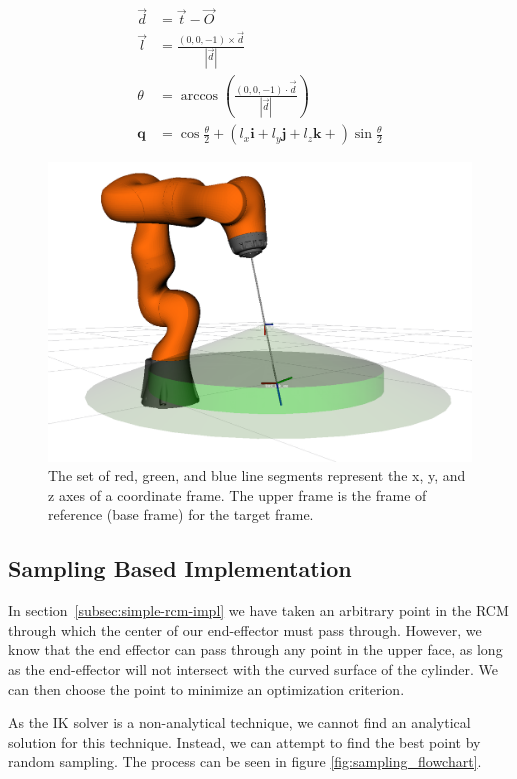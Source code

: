 \documentclass[BTech]{iitmdiss}
\begin{document}
    \begin{align}
        \vec{d} &= \vec{t} - \vec{O} \\
        \vec{l} &= \frac{(0, 0, -1) \times \vec{d}}{|\vec{d}|} \\
        \theta &= \arccos{\left(\frac{(0, 0, -1) \cdot \vec{d}}{|\vec{d}|}\right)} \\
        \mathbf{q} &= \cos{\frac{\theta}{2}} + \left(l_x \mathbf{i} + l_y \mathbf{j} + l_z \mathbf{k} + \right) \sin{\frac{\theta}{2}} \label{eqn:final_q}
    \end{align}


    \begin{figure}
        \centering
        \includegraphics[width=0.5 \linewidth]{./img/coordinate_frames}
        \caption{The set of red, green, and blue line segments represent the x, y, and z axes of a coordinate frame.
        The upper frame is the frame of reference (base frame) for the target frame.}
        \label{fig:coordinate_frames}
    \end{figure}

    \subsection{Sampling Based Implementation}


    In section~\ref{subsec:simple-rcm-impl} we have taken an arbitrary point in the RCM through which the center of our
    end-effector must pass through.
    However, we know that the end effector can pass through any point in the upper face,
    as long as the end-effector will not intersect with the curved surface of the cylinder.
    We can then choose the point to minimize an optimization criterion.

    As the IK solver is a non-analytical technique, we cannot find an analytical solution for this technique.
    Instead, we can attempt to find the best point by random sampling. The process can be seen in figure \ref{fig:sampling_flowchart}.
\end{document}
